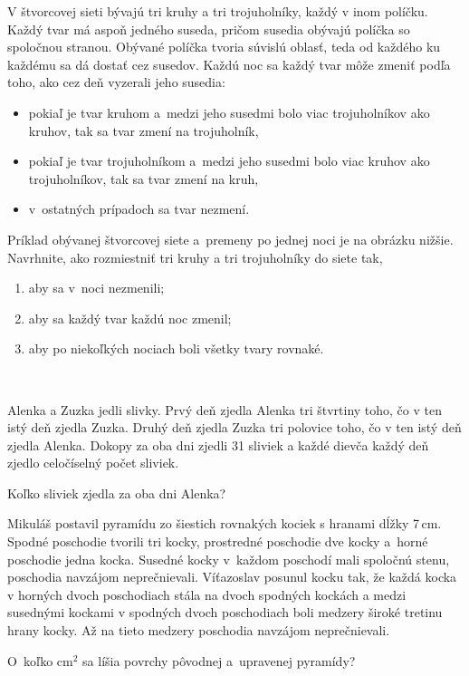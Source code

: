 {%
V štvorcovej sieti bývajú tri kruhy a tri trojuholníky, každý v inom políčku.
Každý tvar má aspoň jedného suseda, pričom susedia obývajú políčka so spoločnou stranou.
Obývané políčka tvoria súvislú oblasť, teda od každého ku každému sa dá dostať cez susedov.
Každú noc sa každý tvar môže zmeniť podľa toho, ako cez deň vyzerali jeho susedia:
\begin{itemize}
  \item pokiaľ je tvar kruhom a~medzi jeho susedmi bolo viac trojuholníkov ako kruhov, tak sa tvar zmení na trojuholník,
  \item pokiaľ je tvar trojuholníkom a~medzi jeho susedmi bolo viac kruhov ako trojuholníkov, tak sa tvar zmení na kruh,
  \item v~ostatných prípadoch sa tvar nezmení.
\end{itemize}
\noindent
Príklad obývanej štvorcovej siete a~premeny po jednej noci je na obrázku nižšie.
Navrhnite, ako rozmiestniť tri kruhy a tri trojuholníky do siete tak,
\begin{enumerate}\alphatrue
  \item aby sa v~noci nezmenili;
  \item aby sa každý tvar každú noc zmenil;
  \item aby po niekoľkých nociach boli všetky tvary rovnaké.
\end{enumerate}
~%
}

{%
Alenka a Zuzka jedli slivky.
Prvý deň zjedla Alenka tri štvrtiny toho, čo v ten istý deň zjedla Zuzka.
Druhý deň zjedla Zuzka tri polovice toho, čo v ten istý deň zjedla Alenka.
Dokopy za oba dni zjedli 31 sliviek a každé dievča každý deň zjedlo celočíselný počet sliviek.

Koľko sliviek zjedla za oba dni Alenka?
}

{%
Mikuláš postavil pyramídu zo šiestich rovnakých kociek s hranami dĺžky 7\,cm.
Spodné poschodie tvorili tri kocky, prostredné poschodie dve kocky a~horné poschodie jedna kocka.
Susedné kocky v~každom poschodí mali spoločnú stenu, poschodia navzájom neprečnievali.
Víťazoslav posunul kocku tak, že každá kocka v horných dvoch poschodiach stála na dvoch spodných kockách a medzi susednými kockami v spodných dvoch poschodiach boli medzery široké tretinu hrany kocky.
Až na tieto medzery poschodia navzájom neprečnievali.

O~koľko cm$^2$ sa líšia povrchy pôvodnej a~upravenej pyramídy?
%
}

